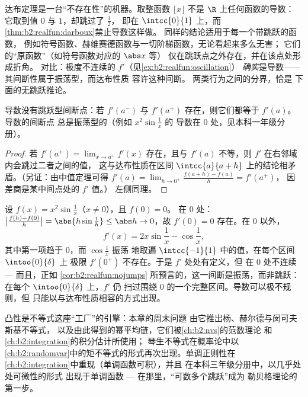 \begin{example}[哪些函数是导数？]\label{ex:b2:realfun:whichderivatives}
达布定理是一台“不存在性”的机器。取整函数
$\lfloor x\rfloor$ 不是 $\R$ 上任何函数的导数：
它取到值 $0$ 与 $1$，却跳过了 $\frac12$，
即在 $\intcc{0}{1}$ 上，而\cref{thm:b2:realfun:darboux}禁止导数这样做。
同样的结论适用于每一个带跳跃的函数，
例如符号函数、赫维赛德函数与一切阶梯函数，无论看起来多么无害；
它们的“原函数”（如符号函数对应的 $\abs x$ 等）
仅在跳跃点之外存在，并在该点处形成折角。
对比：极度不连续的 $f'$（见\cref{ex:b2:realfun:oscillation}）
\emph{确实}是导数——其间断性属于振荡型，而达布性质
容许这种间断。
两类行为之间的分界，恰是
下面的无跳跃推论。
\end{example}

\begin{corollary}\label{cor:b2:realfun:nojumps}
导数没有跳跃型间断点：若 $f'(a^-)$ 与
$f'(a^+)$ 存在，则它们都等于 $f'(a)$。导数的间断点
总是振荡型的（例如 $x^2\sin\frac1x$ 的
导数在 $0$ 处，见本科一年级分册）。
\end{corollary}

\begin{proof}
若 $f'(a^+) = \lim_{x\to a^+} f'(x)$ 存在，且与
$f'(a)$ 不等，则 $f'$ 在右邻域内会跳过二者之间的值，
这与达布性质在区间
$\intcc{a}{a + h}$ 上的结论相矛盾。（另证：由中值定理可得
$f'(a) = \lim_{h\to0^+} \frac{f(a+h)-f(a)}{h} = f'(a^+)$，
因差商是某中间点处的 $f'$ 值。）
左侧同理。
\end{proof}

\begin{example}[典型的振荡导数]\label{ex:b2:realfun:oscillation}
设 $f(x) = x^2\sin\frac1x$（$x \neq 0$），且 $f(0) = 0$。
在 $0$ 处：$\bigl|\frac{f(h) - f(0)}{h}\bigr| = \abs{h\sin\frac1h}
\leq \abs h \to 0$，故 $f'(0) = 0$ 存在。在 $0$ 以外，
\[
f'(x) = 2x\sin\frac1x - \cos\frac1x ,
\]
其中第一项趋于 $0$，而 $\cos\frac1x$ 振荡
地取遍 $\intcc{-1}{1}$ 中的值，在每个区间 $\intoo{0}{\delta}$ 上
极限 $f'(0^+)$ 不存在。于是 $f'$ 处处有定义，但
在 $0$ 处不连续 --- 而且，正如
\cref{cor:b2:realfun:nojumps} 所预言的，这一间断是振荡，而非跳跃：
在每个 $\intoo{0}{\delta}$ 上，$f'$ 仍
扫过围绕 $0$ 的一个完整区间。导数可以极不规则，但
只能以与达布性质相容的方式出现。
\end{example}

\begin{remark}[本章的应用]
凸性是不等式这座“工厂”的引擎：本章的周末问题
由它推出杨、赫尔德与闵可夫斯基不等式，
以及由此得到的幂平均链，它们被\cref{ch:b2:nvs}的范数理论
和\cref{ch:b2:integration}的积分估计所使用；
琴生不等式在概率论中以
\cref{ch:b2:randomvar}中的矩不等式的形式再次出现。单调正则性在
\cref{ch:b2:integration}中重现（单调函数可积），并且
在本科三年级分册中，以几乎处处可微性的形式
出现于单调函数 --- 在那里，“可数多个跳跃”成为
勒贝格理论的第一步。
\end{remark}


